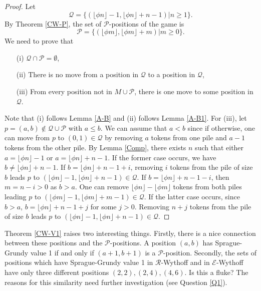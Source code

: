 \documentclass[12pt]{amsart}
\theoremstyle{plain}
\theoremstyle{definition}
\theoremstyle{remark}
\begin{document}
\begin{proof}
Let
\[{\mathcal{Q}} = \{(\lfloor \phi n \rfloor - 1, \lfloor \phi n \rfloor +n-1) | n \geq 1\}.\]
By Theorem \ref{CW-P}, the set of ${\mathcal{P}}$-positions of the game is
\[{\mathcal{P}} = \{(\lfloor \phi m \rfloor, \lfloor \phi m \rfloor + m)| m \geq 0\}.\]
We need to prove that
\begin{itemize}
\item [(i)] ${\mathcal{Q}} \cap {\mathcal{P}} = \emptyset$,
\item [(ii)] There is no move from a position in ${\mathcal{Q}}$ to a position in ${\mathcal{Q}}$,
\item [(iii)] From every position not in $M\cup {\mathcal{P}}$, there is one move to some position in ${\mathcal{Q}}$.
\end{itemize}

Note that (i) follows Lemma \ref{A-B} and (ii) follows Lemma \ref{A-B1}. For (iii), let $p = (a,b) \notin {\mathcal{Q}} \cup {\mathcal{P}}$ with $a \leq b$. We can assume that $a < b$ since if otherwise, one can move from $p$ to $(0,1) \in {\mathcal{Q}}$ by removing $a$ tokens from one pile and $a-1$ tokens from the other pile. By Lemma \ref{Comp}, there exists $n$ such that either $a = \lfloor \phi n \rfloor - 1$ or $a = \lfloor \phi n \rfloor + n - 1$. If the former case occurs, we have $b \neq \lfloor \phi n \rfloor + n - 1$. If $b = \lfloor \phi n \rfloor + n - 1 + i$, removing $i$ tokens from the pile of size $b$ leads $p$ to $(\lfloor \phi n \rfloor - 1, \lfloor \phi n \rfloor + n - 1) \in {\mathcal{Q}}$. If $b = \lfloor \phi n \rfloor + n - 1-i$, then $m = n-i > 0$ as $b > a$. One can remove $\lfloor \phi n \rfloor - \lfloor \phi m \rfloor$ tokens from both piles leading $p$ to $(\lfloor \phi m \rfloor - 1, \lfloor \phi m \rfloor +m-1) \in {\mathcal{Q}}$. If the latter case occurs, since $b > a$, $b = \lfloor \phi n \rfloor + n - 1 +j$ for some $j > 0$. Removing $n+j$ tokens from the pile of size $b$ leads $p$ to $(\lfloor \phi n \rfloor - 1, \lfloor \phi n \rfloor + n - 1) \in {\mathcal{Q}}$.
\end{proof}

Theorem \ref{CW-V1} raises two interesting things. Firstly, there is a nice connection between these positions and the ${\mathcal{P}}$-positions. A position $(a,b)$ has Sprague-Grundy value 1 if and only if $(a+1,b+1)$ is a ${\mathcal{P}}$-position. Secondly, the sets of positions which have Sprague-Grundy value 1 in ${\mathcal{R}}$-Wythoff and in ${\mathcal{E}}$-Wythoff have only three different positions $(2,2), (2,4), (4,6)$. Is this a fluke? The reasons for this similarity need further investigation (see Question \ref{Q1}).
\end{document}
